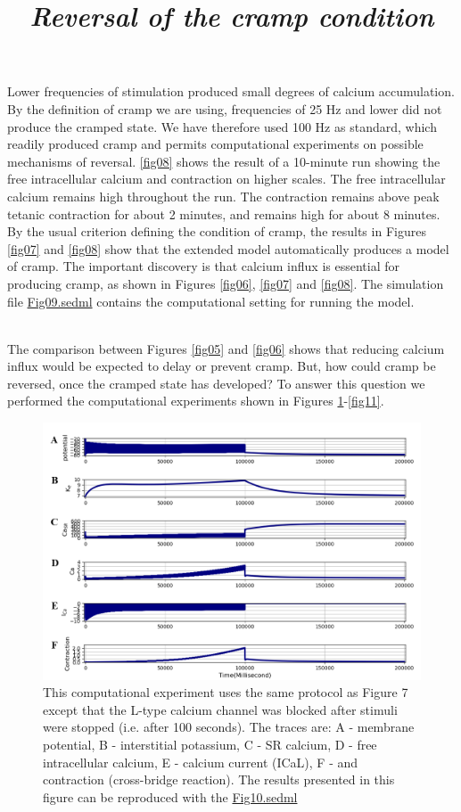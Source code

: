 \documentclass[fleqn,10pt]{physiome}
\begin{document}
Lower frequencies of stimulation produced small degrees of calcium accumulation. By the definition of cramp we are using, frequencies of 25 Hz and lower did not produce the cramped state. We have therefore used 100 Hz as standard, which readily produced cramp and permits computational experiments on possible mechanisms of reversal. \autoref{fig08} shows the result of a 10-minute run showing the free intracellular calcium and contraction on higher scales. The free intracellular calcium remains high throughout the run. The contraction remains above peak tetanic contraction for about 2 minutes, and remains high for about 8 minutes. By the usual criterion defining the condition of cramp, the results in Figures \ref{fig07} and \ref{fig08} show that the extended model automatically produces a model of cramp. The important discovery is that calcium influx is essential for producing cramp, as shown in Figures \ref{fig06}, \ref{fig07} and \ref{fig08}. The simulation file \href{http://models.cellml.org/workspace/5f4/file/4071d5b4ec40c5e2b845a7a75e942df1966d2ba2/Fig09.sedml}{Fig09.sedml} contains the computational setting for running the model.

\title{\textit{Reversal of the cramp condition}}\\\newline
The comparison between Figures \ref{fig05} and \ref{fig06} shows that reducing calcium influx would be expected to delay or prevent cramp. But, how could cramp be reversed, once the cramped state has developed? To answer this question we performed the computational experiments shown in Figures \ref{fig09}-\ref{fig11}.\\\newline

\begin{figure}[h!]
\centering
\includegraphics[width=0.9\linewidth]{figure09}
\caption{This computational experiment uses the same protocol as Figure 7 except that the L-type calcium channel was blocked after stimuli were stopped (i.e. after 100 seconds). The traces are: A - membrane potential, B - interstitial potassium, C - SR calcium, D - free intracellular calcium, E - calcium current (ICaL), F - and contraction (cross-bridge reaction). The results presented in this figure can be reproduced with the \href{https://models.physiomeproject.org/workspace/5f4/file/26289d9227fbf4f66ca8106d8bf80ff9a51a5ac6/Fig10.sedml}{Fig10.sedml}}
\label{fig09}
\end{figure}
\end{document}
